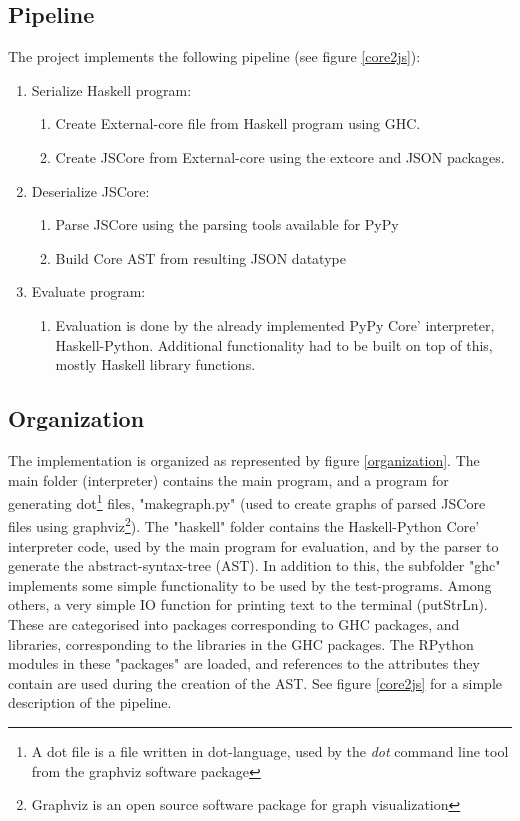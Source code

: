 \subsection{Pipeline}

The project implements the following pipeline (see figure \ref{core2js}):
\begin{enumerate}
\item Serialize Haskell program: 
  \begin{enumerate}
  \item Create External-core file from Haskell program using GHC.
  \item Create JSCore from External-core using the extcore and JSON packages.
  \end{enumerate}
\item Deserialize JSCore:
  \begin{enumerate}
  \item Parse JSCore using the parsing tools available for PyPy
  \item Build Core AST from resulting JSON datatype
  \end{enumerate}
\item Evaluate program:
  \begin{enumerate}
  \item Evaluation is done by the already implemented PyPy Core' interpreter,
  Haskell-Python. Additional functionality had to be built on top of this, mostly 
  Haskell library functions.
  \end {enumerate}
\end{enumerate}

\subsection{Organization}

The implementation is organized as represented by figure \ref{organization}. The
main folder (interpreter) contains the main program, and a program for generating
dot\footnote{ A dot file is a file written in dot-language, used by the \emph{dot} 
command line tool from the graphviz software package}
files, "makegraph.py" (used to create graphs of parsed JSCore files using 
graphviz\footnote{ Graphviz is an open source software package for graph 
visualization}). The "haskell" folder contains the Haskell-Python Core' 
interpreter code, used by the main program for evaluation, 
and by the parser to generate the abstract-syntax-tree (AST). In addition to this,
the subfolder "ghc" implements some simple functionality to be used by the test-programs.
Among others, a very simple IO function for printing text to the terminal (putStrLn).
These are categorised into packages corresponding to GHC packages, and libraries, 
corresponding to the libraries in the GHC packages.
The RPython modules in these "packages" are loaded, and references to the attributes
they contain are used during
the creation of the AST. See figure \ref{core2js} for a simple description of the pipeline.

